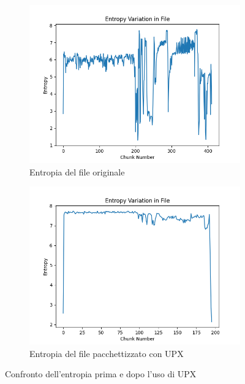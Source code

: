 \begin{figure}[!htb]
    \centering
    \begin{subfigure}[t]{0.48\textwidth}
        \centering
        \includegraphics[width=\textwidth]{assets/patriot-original.exe.png}
        \caption{Entropia del file originale}
    \end{subfigure}
    \begin{subfigure}[t]{0.48\textwidth}
        \centering
        \includegraphics[width=\textwidth]{assets/patriot-upx.exe.png}
        \caption{Entropia del file pacchettizzato con UPX}
    \end{subfigure}
    \caption{Confronto dell'entropia prima e dopo l'uso di UPX}
    \label{fig:entropy_upx_comparison}
\end{figure}

